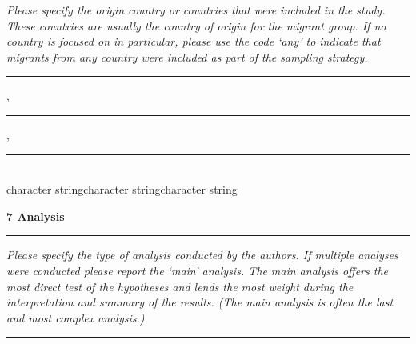 \documentclass[10pt,a4paper]{protocol}
\newlength{\rulewidth}
\newlength{\ruleandnamegap}
\newcommand{\namefont}{\tiny}
\newcommand{\ruleandname}[2]{%
  \par\noindent
  \rule{#2}{\rulewidth}\par
  \vspace{\dimexpr-\baselineskip+\ruleandnamegap}
  \noindent{\namefont #1}\par
  \addvspace{\baselineskip}
}
\newcommand\category[2]{
{\Large\bfseries\color{emphasis} \vspace{0.25em} #1 \hspace{0.5em} #2 \\ [-0.6em] \rule{\textwidth}{0.4pt} \vspace{0.25em}}
}
\begin{document}
\textit{Please specify the origin country or countries that were included in the study. These countries are usually the country of origin for the migrant group. If no country is focused on in particular, please use the code `any' to indicate that migrants from any country were included as part of the sampling strategy.}
\vspace{1.5em}

\rule{3cm}{} , \rule{3cm}{} , \rule{3cm}{}\\
\vspace{\dimexpr-\baselineskip+\ruleandnamegap}
{\namefont character string\hspace{2.08cm}character string\hspace{2.08cm}character string}\par
\divider

\category{7}{Analysis}


\textit{Please specify the type of analysis conducted by the authors. If multiple analyses were conducted please report the `main' analysis. The main analysis offers the most direct test of the hypotheses and lends the most weight during the interpretation and summary of the results. (The main analysis is often the last and most complex analysis.)}
\vspace{1.5em}
\ruleandname{character string}{5cm} 
\divider
\end{document}
